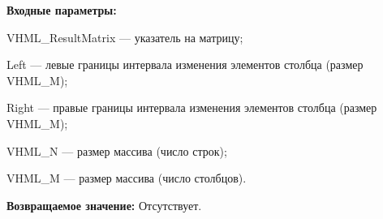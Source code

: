 \textbf{Входные параметры:}

 VHML\_ResultMatrix --- указатель на матрицу;
 
 Left --- левые границы интервала изменения элементов столбца (размер VHML\_M);
 
 Right --- правые границы интервала изменения элементов столбца (размер VHML\_M);
 
 VHML\_N --- размер массива (число строк);
 
 VHML\_M --- размер массива (число столбцов).

\textbf{Возвращаемое значение:}
Отсутствует.